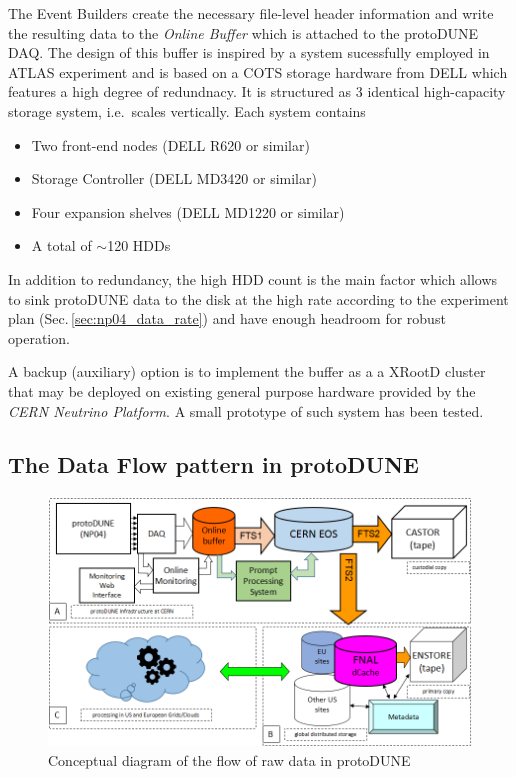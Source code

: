 \documentclass[a4paper]{jpconf}
\newcommand{\pd}{protoDUNE\xspace}
\begin{document}
The Event Builders create the necessary file-level header information and write the
resulting data  to the \textit{Online Buffer} which is attached to the \pd DAQ. 
The design of this buffer is inspired by a system sucessfully employed in ATLAS experiment
and is based on a COTS storage hardware from DELL which features a high degree of redundnacy.
It is structured as 3 identical high-capacity storage system, i.e.~scales vertically. Each system contains
\begin{itemize}

\item Two front-end nodes (DELL R620 or similar)
\item Storage Controller (DELL MD3420 or similar)
\item Four expansion shelves (DELL MD1220 or similar)
\item A total of $\sim$120 HDDs
\end{itemize}

\noindent In addition to redundancy, the high HDD count is the main factor which allows
to sink \pd data to the disk at the high rate according to the experiment plan (Sec.\,\ref{sec:np04_data_rate})
and have enough headroom for robust operation.


A backup (auxiliary) option is to implement the buffer as a a XRootD \cite{xrootd} cluster
that may be deployed on existing general purpose hardware provided by the \textit{CERN
Neutrino Platform}\cite{cenf}.
A small prototype of such system has been tested.


\subsection{The Data Flow pattern in \pd}
\begin{figure}[tbh]
\centering\includegraphics[width=0.85\linewidth]{figures/protoDUNE_data_flow_2017_v1.png}
\caption{\label{fig:raw_concept}Conceptual diagram of the flow of raw data in \pd}
\end{figure}
\end{document}
